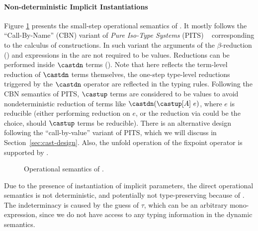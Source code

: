 \paragraph{Non-deterministic Implicit Instantiations}
Figure \ref{fig:semantics} presents the small-step operational semantics of \name.
It mostly follows the ``Call-By-Name'' (CBN) variant of \emph{Pure Iso-Type Systems} (PITS)
~\citep{yang2019pure} corresponding to the calculus of constructions. In such variant
the arguments of the $\beta$-reduction () and expressions in
the  are not required to be values.
Reductions can be performed inside $\castdn$ terms ().
Note that here  reflects the term-level reduction of $\castdn$ terms themselves,
the one-step type-level reductions triggered by the $\castdn$ operator are
reflected in the typing rules.
Following the CBN semantics of PITS, $\castup$ terms are considered to be values
to avoid nondeterministic reduction of terms like $\castdn (\castup [A] ~e)$,
where $e$ is reducible (either performing reduction on $e$, or the reduction via
 could be the choice, should $\castup$ terms be reducible).
There is an alternative design following the ``call-by-value'' variant of PITS, which
we will discuss in Section~\ref{sec:cast-design}.
Also, the unfold operation of the fixpoint operator is supported by .

\begin{figure}[t]
    \centering


    \caption{Operational semantics of \name.}
    \label{fig:semantics}
\end{figure}

Due to the presence of instantiation of implicit parameters, the direct operational
semantics is not deterministic, and potentially not type-preserving because of
. The indeterminacy is caused by the guess of $\tau$,
which can be an arbitrary mono-expression, since we do not have access to any typing
information in the dynamic semantics.

